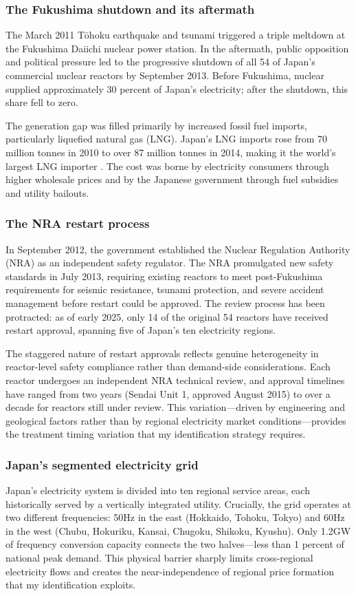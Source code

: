 \documentclass[12pt]{article}
\begin{document}
\subsubsection*{The Fukushima shutdown and its aftermath} The March 2011 T\=ohoku earthquake and tsunami triggered a triple meltdown at the Fukushima Daiichi nuclear power station. In the aftermath, public opposition and political pressure led to the progressive shutdown of all 54 of Japan's commercial nuclear reactors by September 2013. Before Fukushima, nuclear supplied approximately 30 percent of Japan's electricity; after the shutdown, this share fell to zero.

The generation gap was filled primarily by increased fossil fuel imports, particularly liquefied natural gas (LNG). Japan's LNG imports rose from 70 million tonnes in 2010 to over 87 million tonnes in 2014, making it the world's largest LNG importer \citep{Vivoda2019}. The cost was borne by electricity consumers through higher wholesale prices and by the Japanese government through fuel subsidies and utility bailouts.

\subsubsection*{The NRA restart process} In September 2012, the government established the Nuclear Regulation Authority (NRA) as an independent safety regulator. The NRA promulgated new safety standards in July 2013, requiring existing reactors to meet post-Fukushima requirements for seismic resistance, tsunami protection, and severe accident management before restart could be approved. The review process has been protracted: as of early 2025, only 14 of the original 54 reactors have received restart approval, spanning five of Japan's ten electricity regions.

The staggered nature of restart approvals reflects genuine heterogeneity in reactor-level safety compliance rather than demand-side considerations. Each reactor undergoes an independent NRA technical review, and approval timelines have ranged from two years (Sendai Unit 1, approved August 2015) to over a decade for reactors still under review. This variation---driven by engineering and geological factors rather than by regional electricity market conditions---provides the treatment timing variation that my identification strategy requires.

\subsubsection*{Japan's segmented electricity grid} Japan's electricity system is divided into ten regional service areas, each historically served by a vertically integrated utility. Crucially, the grid operates at two different frequencies: 50Hz in the east (Hokkaido, Tohoku, Tokyo) and 60Hz in the west (Chubu, Hokuriku, Kansai, Chugoku, Shikoku, Kyushu). Only 1.2GW of frequency conversion capacity connects the two halves---less than 1 percent of national peak demand. This physical barrier sharply limits cross-regional electricity flows and creates the near-independence of regional price formation that my identification exploits.
\end{document}
